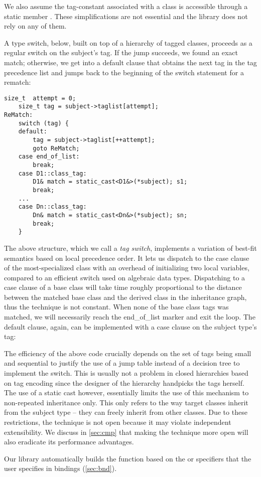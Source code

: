 We also assume the tag-constant associated with a class  is accessible 
through a static member . These simplifications are not 
essential and the library does not rely on any of them.

A type switch, below, built on top of a hierarchy of tagged classes, proceeds as 
a regular switch on the subject's tag. If the jump succeeds, we found an exact 
match; otherwise, we get into a default clause that obtains the next tag in the 
tag precedence list and jumps back to the beginning of the switch statement for a 
rematch:

\begin{lstlisting}[keepspaces]
          size_t  attempt = 0;
    size_t tag = subject->taglist[attempt];
ReMatch:
    switch (tag) {
    default:
        tag = subject->taglist[++attempt];
        goto ReMatch;
    case end_of_list: 
        break;
    case D1::class_tag: 
        D1& match = static_cast<D1&>(*subject); s1;
        break;
    ...
    case Dn::class_tag: 
        Dn& match = static_cast<Dn&>(*subject); sn;
        break;
    }
\end{lstlisting}

\noindent
The above structure, which we call a \emph{tag switch}, implements a variation of 
best-fit semantics based on local precedence order. It lets us dispatch to the case 
clause of the most-specialized class with an overhead of initializing two 
local variables, compared to an efficient switch used on algebraic data types. 
Dispatching to a case clause of a base class will take time roughly proportional 
to the distance between the matched base class and the derived class in the 
inheritance graph, thus the technique is not constant. When none of the base 
class tags was matched, we will necessarily reach the end\_of\_list marker %
and exit the loop. %
The default clause, %
again, can be implemented with a case clause on the subject type's tag: 

The efficiency of the above code crucially depends on the set of tags 
being small and sequential to justify the use of a jump table instead of a
decision tree to implement the switch. This is usually not a problem in closed 
hierarchies based on tag encoding since the designer of the hierarchy handpicks 
the tags herself. The use of a static cast %
however, essentially limits the use of 
this mechanism to non-repeated inheritance only. This only refers to the way target 
classes inherit from the subject type -- they can freely inherit from other classes. 
Due to these restrictions, the technique is not open because it may  
violate independent extensibility. We discuss in \textsection\ref{sec:cmp} that 
making the technique more open will also eradicate its performance advantages.

Our library automatically builds the function  based on the 
 or  specifiers that the user specifies in bindings 
(\textsection\ref{sec:bnd}).
